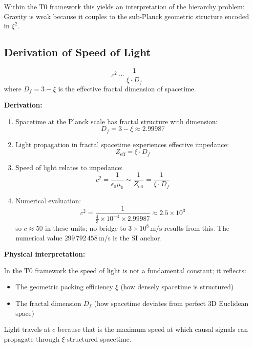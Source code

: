 	Within the T0 framework this yields an interpretation of the hierarchy problem: Gravity is weak because it couples to the sub-Planck geometric structure encoded in $\xi^2$.
	
	\subsection{Derivation of Speed of Light}
	
	\begin{keyresult}
		\[
		c^2 \sim \frac{1}{\xi \cdot D_f}
		\]
		where $D_f = 3 - \xi$ is the effective fractal dimension of spacetime.
	\end{keyresult}
	
	\textbf{Derivation:}
	
	\begin{enumerate}
		\item Spacetime at the Planck scale has fractal structure with dimension:
		\[
		D_f = 3 - \xi \approx 2.99987
		\]
		
		\item Light propagation in fractal spacetime experiences effective impedance:
		\[
		Z_{\text{eff}} = \xi \cdot D_f
		\]
		
		\item Speed of light relates to impedance:
		\[
		c^2 = \frac{1}{\epsilon_0 \mu_0} \sim \frac{1}{Z_{\text{eff}}} = \frac{1}{\xi \cdot D_f}
		\]
		
		\item Numerical evaluation:
		\[
		c^2 = \frac{1}{\frac{4}{3} \times 10^{-4} \times 2.99987} \approx 2.5 \times 10^{3}
		\]
		so $c \approx 50$ in these units; no bridge to $3 \times 10^8\,\text{m/s}$ results from this. The numerical value $299\,792\,458$\,m/s is the SI anchor.
	\end{enumerate}
	
	\textbf{Physical interpretation:}
	
	In the T0 framework the speed of light is not a fundamental constant; it reflects:
	\begin{itemize}
		\item The geometric packing efficiency $\xi$ (how densely spacetime is structured)
		\item The fractal dimension $D_f$ (how spacetime deviates from perfect 3D Euclidean space)
	\end{itemize}
	
	Light travels at $c$ because that is the maximum speed at which causal signals can propagate through $\xi$-structured spacetime.
	
